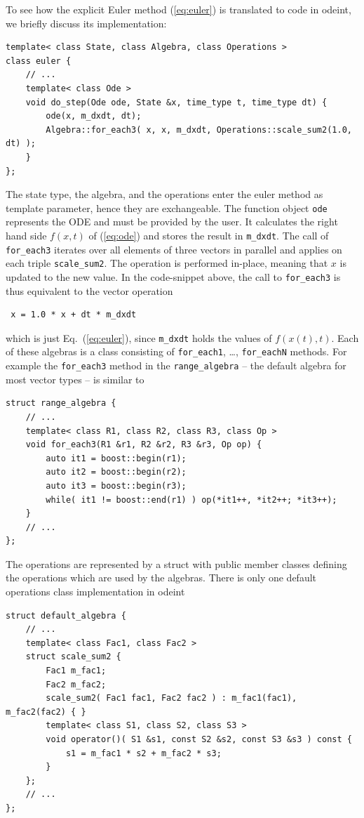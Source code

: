 \documentclass[final]{siamltex}
\newcommand{\code}[1]{\lstinline|#1|}
\newcommand{\eqref}[1]{(\ref{#1})}
\begin{document}
To see how the explicit Euler method \eqref{eq:euler} is translated to
code in odeint, we briefly discuss its implementation:
\begin{lstlisting}
template< class State, class Algebra, class Operations >
class euler {
    // ...
    template< class Ode >
    void do_step(Ode ode, State &x, time_type t, time_type dt) {
        ode(x, m_dxdt, dt);
        Algebra::for_each3( x, x, m_dxdt, Operations::scale_sum2(1.0, dt) );
    }
};
\end{lstlisting}
The state type, the algebra, and the operations enter the euler method  %
as template parameter, hence they are exchangeable. The function object
\code{ode} represents the ODE and must be provided by the user. It calculates
the right hand side $f(x,t)$ of \eqref{eq:ode} and stores the result in
\code{m_dxdt}. The call of \code{for_each3} iterates over all elements of three vectors in parallel and    %
applies on each triple \code{scale_sum2}. The operation is performed
in-place, meaning that $x$ is updated to the new value.
In the code-snippet above, the call to \code{for_each3} is thus equivalent to the vector operation
\begin{lstlisting}
 x = 1.0 * x + dt * m_dxdt
\end{lstlisting}
which is just Eq.~\eqref{eq:euler}, since \code{m_dxdt} holds the values of $f(x(t), t)$.
Each of these algebras is a class consisting of \code{for_each1},
\dots, \code{for_eachN} methods. For example the \code{for_each3}
method in the \code{range_algebra} -- the default algebra for most vector types -- is similar to
\begin{lstlisting}
struct range_algebra {
    // ...
    template< class R1, class R2, class R3, class Op >
    void for_each3(R1 &r1, R2 &r2, R3 &r3, Op op) {
        auto it1 = boost::begin(r1);
        auto it2 = boost::begin(r2);
        auto it3 = boost::begin(r3);
        while( it1 != boost::end(r1) ) op(*it1++, *it2++; *it3++);
    }
    // ...
};
\end{lstlisting}
The operations are represented by a struct with public member classes defining the
operations which are used by the algebras. There is only one default
operations class implementation in odeint
\begin{lstlisting}
struct default_algebra {
    // ...
    template< class Fac1, class Fac2 >
    struct scale_sum2 {
        Fac1 m_fac1;
        Fac2 m_fac2;
        scale_sum2( Fac1 fac1, Fac2 fac2 ) : m_fac1(fac1), m_fac2(fac2) { }
        template< class S1, class S2, class S3 >
        void operator()( S1 &s1, const S2 &s2, const S3 &s3 ) const {
            s1 = m_fac1 * s2 + m_fac2 * s3;
        }
    };
    // ...
};
\end{lstlisting}
\end{document}
